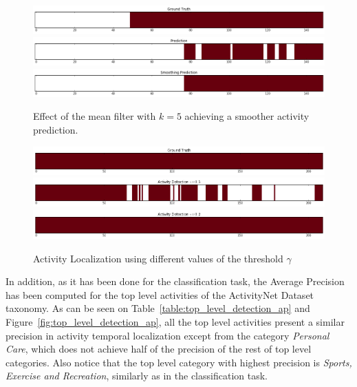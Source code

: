 \begin{figure}[ht]
\begin{center}
\includegraphics[width=1\linewidth]{img/results/smoothing_effect_4}
\includegraphics[width=1\linewidth]{img/results/smoothing_effect_5}
\includegraphics[width=1\linewidth]{img/results/smoothing_effect_6}
\end{center}
\caption{Effect of the mean filter with $k=5$ achieving a smoother activity prediction.}
\label{fig:smoothing_effect}
\end{figure}

\begin{figure}[ht]
\begin{center}
\includegraphics[width=1\linewidth]{img/results/activity_threshold_effect_1}
\includegraphics[width=1\linewidth]{img/results/activity_threshold_effect_2}
\includegraphics[width=1\linewidth]{img/results/activity_threshold_effect_3}
\end{center}
\caption{Activity Localization using different values of the threshold $\gamma$}
\label{fig:activty_threshold_effect}
\end{figure}

In addition, as it has been done for the classification task, the Average Precision has been computed for the top level activities of the ActivityNet Dataset taxonomy. As can be seen on Table~\ref{table:top_level_detection_ap} and Figure~\ref{fig:top_level_detection_ap}, all the top level activities present a similar precision in activity temporal localization except from the category \textit{Personal Care}, which does not achieve half of the precision of the rest of top level categories. Also notice that the top level category with highest precision is \textit{Sports, Exercise and Recreation}, similarly as in the classification task.

